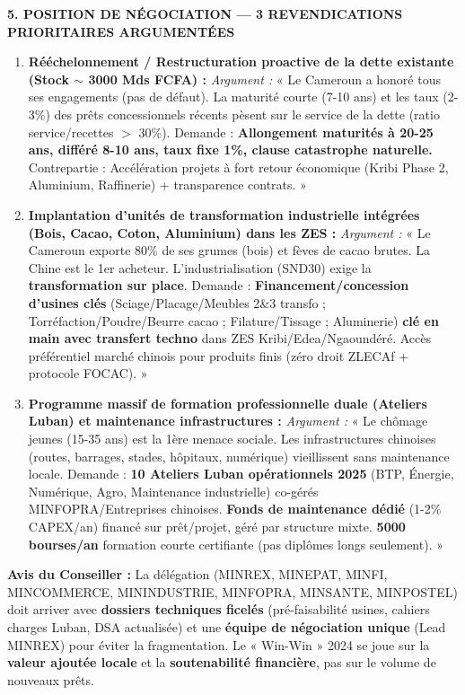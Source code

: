 \documentclass[11pt]{article}
\begin{document}
\begin{corrige}
\vspace{0.3cm}
\noindent\textbf{5. POSITION DE NÉGOCIATION — 3 REVENDICATIONS PRIORITAIRES ARGUMENTÉES}
\begin{enumerate}
    \item \textbf{Rééchelonnement / Restructuration proactive de la dette existante (Stock $\sim$ 3000 Mds FCFA) :} \emph{Argument :} « Le Cameroun a honoré tous ses engagements (pas de défaut). La maturité courte (7-10 ans) et les taux (2-3\%) des prêts concessionnels récents pèsent sur le service de la dette (ratio service/recettes $>$ 30\%). Demande : \textbf{Allongement maturités à 20-25 ans, différé 8-10 ans, taux fixe 1\%, clause catastrophe naturelle.} Contrepartie : Accélération projets à fort retour économique (Kribi Phase 2, Aluminium, Raffinerie) + transparence contrats. »
    \item \textbf{Implantation d'unités de transformation industrielle intégrées (Bois, Cacao, Coton, Aluminium) dans les ZES :} \emph{Argument :} « Le Cameroun exporte 80\% de ses grumes (bois) et fèves de cacao brutes. La Chine est le 1er acheteur. L'industrialisation (SND30) exige la \textbf{transformation sur place}. Demande : \textbf{Financement/concession d'usines clés} (Sciage/Placage/Meubles 2\&3 transfo ; Torréfaction/Poudre/Beurre cacao ; Filature/Tissage ; Aluminerie) \textbf{clé en main avec transfert techno} dans ZES Kribi/Edea/Ngaoundéré. Accès préférentiel marché chinois pour produits finis (zéro droit ZLECAf + protocole FOCAC). »
    \item \textbf{Programme massif de formation professionnelle duale (Ateliers Luban) et maintenance infrastructures :} \emph{Argument :} « Le chômage jeunes (15-35 ans) est la 1ère menace sociale. Les infrastructures chinoises (routes, barrages, stades, hôpitaux, numérique) vieillissent sans maintenance locale. Demande : \textbf{10 Ateliers Luban opérationnels 2025} (BTP, Énergie, Numérique, Agro, Maintenance industrielle) co-gérés MINFOPRA/Entreprises chinoises. \textbf{Fonds de maintenance dédié} (1-2\% CAPEX/an) financé sur prêt/projet, géré par structure mixte. \textbf{5000 bourses/an} formation courte certifiante (pas diplômes longs seulement). »
\end{enumerate}
\vspace{0.5cm}
\noindent\textbf{Avis du Conseiller :} La délégation (MINREX, MINEPAT, MINFI, MINCOMMERCE, MININDUSTRIE, MINFOPRA, MINSANTE, MINPOSTEL) doit arriver avec \textbf{dossiers techniques ficelés} (pré-faisabilité usines, cahiers charges Luban, DSA actualisée) et une \textbf{équipe de négociation unique} (Lead MINREX) pour éviter la fragmentation. Le « Win-Win » 2024 se joue sur la \textbf{valeur ajoutée locale} et la \textbf{soutenabilité financière}, pas sur le volume de nouveaux prêts.
\end{corrige}
\end{document}
